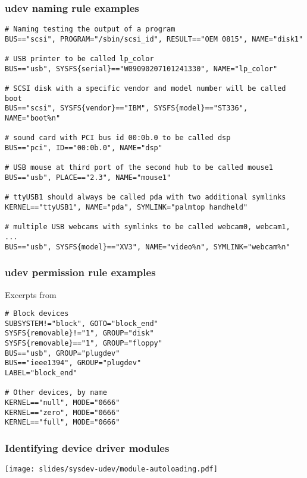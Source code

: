 \begin{frame}[fragile]
  \frametitle{udev naming rule examples}
  \begin{block}{}
\tiny
\begin{verbatim}
# Naming testing the output of a program
BUS=="scsi", PROGRAM="/sbin/scsi_id", RESULT=="OEM 0815", NAME="disk1"

# USB printer to be called lp_color
BUS=="usb", SYSFS{serial}=="W09090207101241330", NAME="lp_color"

# SCSI disk with a specific vendor and model number will be called boot
BUS=="scsi", SYSFS{vendor}=="IBM", SYSFS{model}=="ST336", NAME="boot%n"

# sound card with PCI bus id 00:0b.0 to be called dsp
BUS=="pci", ID=="00:0b.0", NAME="dsp"

# USB mouse at third port of the second hub to be called mouse1
BUS=="usb", PLACE=="2.3", NAME="mouse1"

# ttyUSB1 should always be called pda with two additional symlinks
KERNEL=="ttyUSB1", NAME="pda", SYMLINK="palmtop handheld"

# multiple USB webcams with symlinks to be called webcam0, webcam1, ...
BUS=="usb", SYSFS{model}=="XV3", NAME="video%n", SYMLINK="webcam%n"
\end{verbatim}
  \end{block}
\end{frame}

\begin{frame}[fragile]
  \frametitle{udev permission rule examples}
  Excerpts from 
\begin{block}{}
\begin{verbatim}
# Block devices
SUBSYSTEM!="block", GOTO="block_end"
SYSFS{removable}!="1", GROUP="disk"
SYSFS{removable}=="1", GROUP="floppy"
BUS=="usb", GROUP="plugdev"
BUS=="ieee1394", GROUP="plugdev"
LABEL="block_end"

# Other devices, by name
KERNEL=="null", MODE="0666"
KERNEL=="zero", MODE="0666"
KERNEL=="full", MODE="0666"
\end{verbatim}
  \end{block}
\end{frame}

\begin{frame}
  \frametitle{Identifying device driver modules}
  \begin{center}
    \texttt{[image: slides/sysdev-udev/module-autoloading.pdf]}
  \end{center}
\end{frame}

